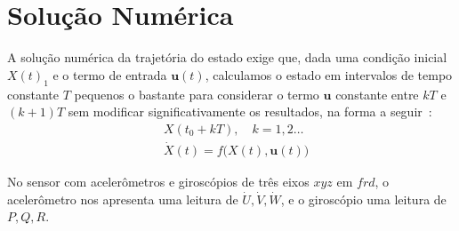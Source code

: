 \section{Solução Numérica}

A solução numérica da trajetória do estado exige que, dada uma condição inicial \(X\left(t\right)_{1}\) e o termo de entrada \(\mathbf{u}(t)\), calculamos o estado em intervalos de tempo constante \(T\) pequenos o bastante para considerar o termo \(\mathbf{u}\) constante entre \(kT\) e \(\left(k+1\right)T\) sem modificar significativamente os resultados, na forma a seguir~\cite{Stevens2016}:
\begin{align*}
    &X \left( t_{0} + kT \right), \quad k = 1,2 \ldots\tag{3.4-1a} \\
    &\dot{X} \left( t \right) = f \big(X\left(t\right), \mathbf{u}\left(t\right)\big)\tag{3.4-1b}
\end{align*}

No sensor com acelerômetros e giroscópios de três eixos \(xyz\) em \(frd\), o acelerômetro nos apresenta uma leitura de \( \dot{U}, \dot{V}, \dot{W}\), e o giroscópio uma leitura de \( P, Q, R\).

